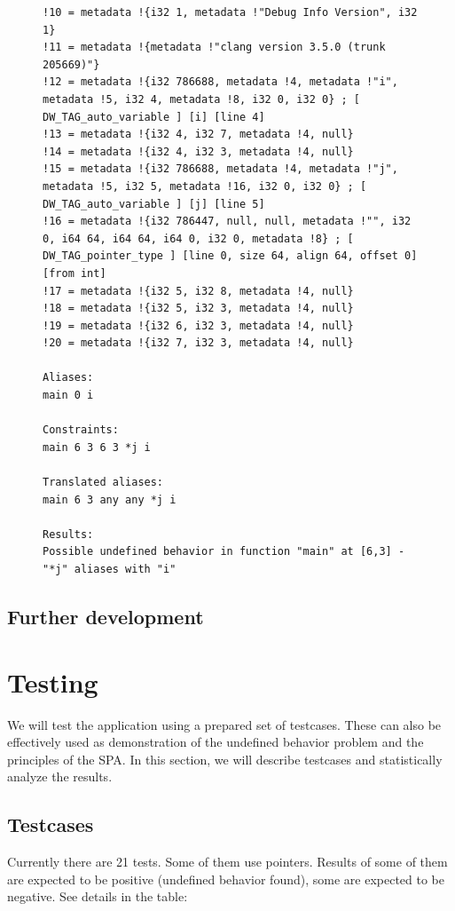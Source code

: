 \begin{figure}
\begin{lstlisting}
!10 = metadata !{i32 1, metadata !"Debug Info Version", i32 1}
!11 = metadata !{metadata !"clang version 3.5.0 (trunk 205669)"}
!12 = metadata !{i32 786688, metadata !4, metadata !"i", metadata !5, i32 4, metadata !8, i32 0, i32 0} ; [ DW_TAG_auto_variable ] [i] [line 4]
!13 = metadata !{i32 4, i32 7, metadata !4, null}
!14 = metadata !{i32 4, i32 3, metadata !4, null}
!15 = metadata !{i32 786688, metadata !4, metadata !"j", metadata !5, i32 5, metadata !16, i32 0, i32 0} ; [ DW_TAG_auto_variable ] [j] [line 5]
!16 = metadata !{i32 786447, null, null, metadata !"", i32 0, i64 64, i64 64, i64 0, i32 0, metadata !8} ; [ DW_TAG_pointer_type ] [line 0, size 64, align 64, offset 0] [from int]
!17 = metadata !{i32 5, i32 8, metadata !4, null}
!18 = metadata !{i32 5, i32 3, metadata !4, null}
!19 = metadata !{i32 6, i32 3, metadata !4, null}
!20 = metadata !{i32 7, i32 3, metadata !4, null}

Aliases:
main 0 i

Constraints:
main 6 3 6 3 *j i

Translated aliases:
main 6 3 any any *j i

Results:
Possible undefined behavior in function "main" at [6,3] - "*j" aliases with "i"
\end{lstlisting}
\end{figure}
\subsection{Further development}
\section{Testing}
We will test the application using a prepared set of testcases. These can also be effectively used as demonstration of the undefined behavior problem and the principles of the SPA.
In this section, we will describe testcases and statistically analyze the results.
\subsection{Testcases}
Currently there are 21 tests. Some of them use pointers. Results of some of them are expected to be positive (undefined behavior found), some are expected to be negative. See details in the table:\\

